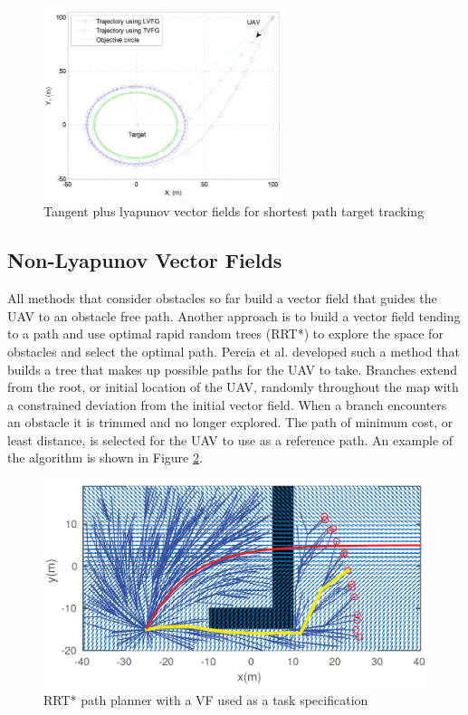 \documentclass[numbered,pdftex]{ohio-etd}
\begin{document}
\begin{figure}
	\centering
	\includegraphics[width=7cm]{PaperFigures/lyapunovChen}
	\caption{Tangent plus lyapunov vector fields for shortest path target tracking \cite{chen_uav_2013}}
	\label{fig:lyapunovChen}
\end{figure}


\subsection{Non-Lyapunov Vector Fields}

All methods that consider obstacles so far build a vector field that guides the UAV to an obstacle free path. Another approach is to build a vector field tending to a path and use optimal rapid random trees (RRT*) to explore the space for obstacles and select the optimal path. Pereia et al. developed such a method that builds a tree that makes up possible paths for the UAV to take. Branches extend from the root, or initial location of the UAV, randomly throughout the map with a constrained deviation from the initial vector field. When a branch encounters an obstacle it is trimmed and no longer explored. The path of minimum cost, or least distance, is selected for the UAV to use as a reference path. An example of the algorithm is shown in Figure \ref{fig:rrtvf}.

\begin{figure}
	\centering
	\includegraphics[width=12cm]{PaperFigures/rrtVF}
	\caption{RRT* path planner with a VF used as a task specification}
	\label{fig:rrtvf}
\end{figure}
\end{document}

